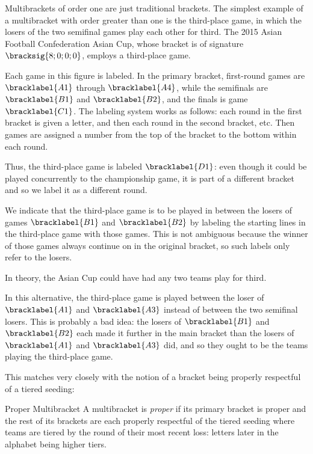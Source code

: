 {    Multibrackets of order one are just traditional brackets. The simplest example of a multibracket with order greater than one is the third-place game, in which the losers of the two semifinal games play each other for third. The 2015 Asian Football Confederation Asian Cup, whose bracket is of signature $\bracksig{8; 0; 0; 0}$, employs a third-place game.


    Each game in this figure is labeled. In the primary bracket, first-round games are $\bracklabel{A1}$ through $\bracklabel{A4}$, while the semifinals are $\bracklabel{B1}$ and $\bracklabel{B2}$, and the finals is game $\bracklabel{C1}$. The labeling system works as follows: each round in the first bracket is given a letter, and then each round in the second bracket, etc. Then games are assigned a number from the top of the bracket to the bottom within each round.
    
    Thus, the third-place game is labeled $\bracklabel{D1}$: even though it could be played concurrently to the championship game, it is part of a different bracket and so we label it as a different round.

    We indicate that the third-place game is to be played in between the losers of games $\bracklabel{B1}$ and $\bracklabel{B2}$ by labeling the starting lines in the third-place game with those games. This is not ambiguous because the winner of those games always continue on in the original bracket, so such labels only refer to the losers. 
    
    In theory, the Asian Cup could have had any two teams play for third.


    In this alternative, the third-place game is played between the loser of $\bracklabel{A1}$ and $\bracklabel{A3}$ instead of between the two semifinal losers. This is probably a bad idea: the losers of $\bracklabel{B1}$ and $\bracklabel{B2}$ each made it further in the main bracket than the losers of $\bracklabel{A1}$ and $\bracklabel{A3}$ did, and so they ought to be the teams playing the third-place game.

    This matches very closely with the notion of a bracket being properly respectful of a tiered seeding:

    \begin{definition}{Proper Multibracket}{}
        A multibracket is \textit{proper} if its primary bracket is proper and the rest of its brackets are each properly respectful of the tiered seeding where teams are tiered by the round of their most recent loss: letters later in the alphabet being higher tiers.
    \end{definition}

}
